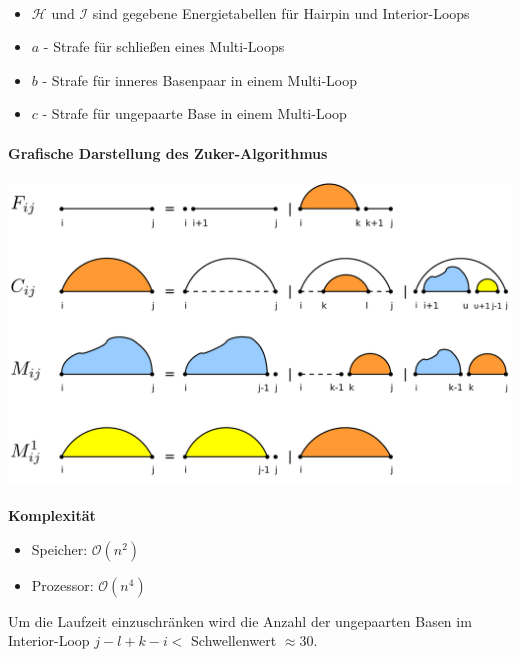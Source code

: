 \paragraph{}
\begin{itemize}
	\item[]$\mathcal{H}$ und $\mathcal{I}$ sind gegebene Energietabellen für Hairpin und Interior-Loops
	\item[]$a$ - Strafe f\"ur schließen eines Multi-Loops
	\item[]$b$ - Strafe f\"ur inneres Basenpaar in einem Multi-Loop
	\item[]$c$ - Strafe f\"ur ungepaarte Base in einem Multi-Loop
\end{itemize}
\paragraph{}
 \textbf{Grafische Darstellung des Zuker-Algorithmus}\\\\
\includegraphics[scale=0.2]{lectures/160404_2/pix/zuker-lorenz-mod.png}\\
\paragraph{}
 \textbf{Komplexit\"at}
\begin{itemize}
	\item[] Speicher: $\mathcal{O}(n^2)$
	\item[] Prozessor: $\mathcal{O}(n^4)$
\end{itemize}
Um die Laufzeit einzuschr\"anken wird die Anzahl der ungepaarten Basen im Interior-Loop $j-l+k-i<$ Schwellenwert $\approx 30$.
